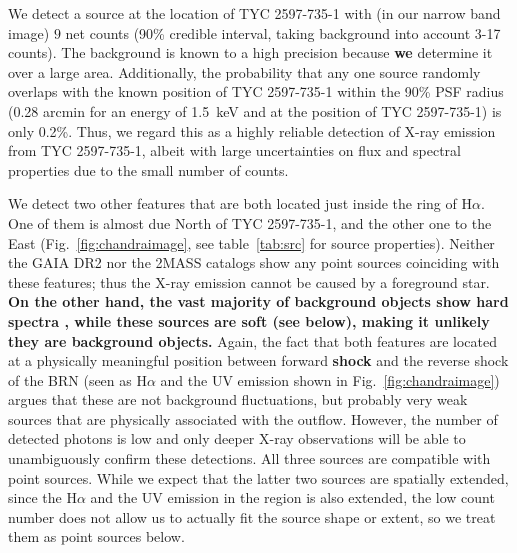 \documentclass[linenumbers]{aastex631}
\begin{document}
We detect a source at the location of TYC 2597-735-1 with (in our narrow band image) $9$ net counts (90\% credible interval, taking background into account 3-17 counts). The background is known to a high precision because \textbf{we} determine it over a large area. Additionally, the probability that any one source randomly overlaps with the known position of TYC 2597-735-1 within the 90\% PSF radius (0.28 arcmin for an energy of 1.5~keV and at the position of TYC 2597-735-1) is only 0.2\%. Thus, we regard this as a highly reliable detection of X-ray emission from TYC 2597-735-1, albeit with large uncertainties on flux and spectral properties due to the small number of counts.

We detect two other features that are both located just inside the ring of H$\alpha$. One of them is almost due North of TYC 2597-735-1, and the other one to the East (Fig.~\ref{fig:chandraimage}, see table~\ref{tab:src} for source properties).  Neither the GAIA DR2 \citep{2016A&A...595A...1G,2018A&A...616A...1G} nor the 2MASS \citep{2006AJ....131.1163S} catalogs show any point sources coinciding with these features; thus the X-ray emission cannot be caused by a foreground star. 
\textbf{On the other hand, the vast majority of background objects show hard spectra \citep{2003ApJ...588..696M}, while these sources are soft (see below), making it unlikely they are background objects.}
Again, the fact that both features are located at a physically meaningful position between forward \textbf{shock} and the reverse shock of the BRN (seen as H$\alpha$ and the UV emission shown in Fig.~\ref{fig:chandraimage}) argues that these are not background fluctuations, but probably very weak sources that are physically associated with the outflow. However, the number of detected photons is low and only deeper X-ray observations will be able to unambiguously confirm these detections.
All three sources are compatible with point sources. While we expect that the latter two sources are spatially extended, since the H$\alpha$ and the UV emission in the region is also extended, the low count number does not allow us to actually fit the source shape or extent, so we treat them as point sources below.
\end{document}
